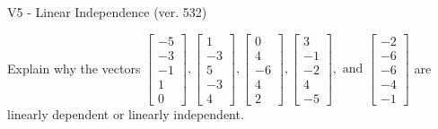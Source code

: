 \begin{exercise}
  \begin{exerciseTitle}V5 - Linear Independence (ver. 532)\end{exerciseTitle}
  \begin{exerciseStatement}
    Explain why the vectors \(\left[\begin{array}{r}
-5 \\
-3 \\
-1 \\
1 \\
0
\end{array}\right] , \left[\begin{array}{r}
1 \\
-3 \\
5 \\
-3 \\
4
\end{array}\right] , \left[\begin{array}{r}
0 \\
4 \\
-6 \\
4 \\
2
\end{array}\right] , \left[\begin{array}{r}
3 \\
-1 \\
-2 \\
4 \\
-5
\end{array}\right] , \text{ and } \left[\begin{array}{r}
-2 \\
-6 \\
-6 \\
-4 \\
-1
\end{array}\right]\) are linearly dependent or linearly independent.	



\end{exerciseStatement}
\end{exercise}
